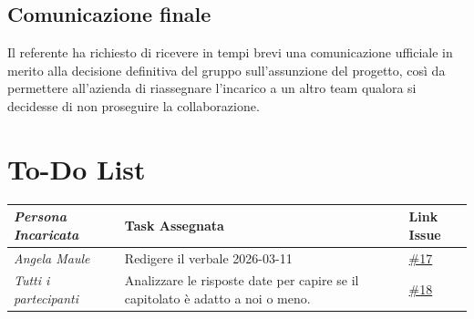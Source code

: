 \documentclass[a4paper,12pt]{article}
\begin{document}
\subsection{Comunicazione finale}
Il referente ha richiesto di ricevere in tempi brevi una comunicazione ufficiale in merito alla decisione definitiva del gruppo sull'assunzione del progetto, così da permettere all'azienda di riassegnare l'incarico a un altro team qualora si decidesse di non proseguire la collaborazione.

\section{To-Do List}
\begin{table}[h]
    \centering
    \begin{tabular}{|l|p{5cm}|l|}
    \hline
        \rowcolor{lightgray}\textit{\textbf{Persona Incaricata}}  & \textbf{Task Assegnata} &\textbf{Link Issue} \\
    \hline
        \textit{Angela Maule} &  Redigere il verbale 2026-03-11 & \href{https://github.com/aLittleByte-19/Documentazione/issues/17}{\#17}\\
    \hline
        \textit{Tutti i partecipanti} & Analizzare le risposte date per capire se il capitolato è adatto a noi o meno. &\href{https://github.com/aLittleByte-19/Documentazione/issues/18}{\#18}\\
    \hline
    \end{tabular}
    \label{tab:todo}
\end{table}
\end{document}
